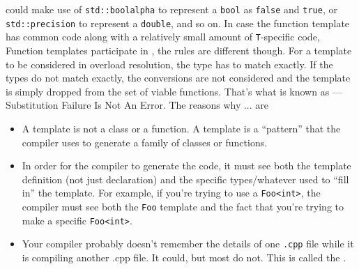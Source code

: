 could make use of \texttt{std::boolalpha} to represent a \texttt{bool} as 
\texttt{false} and \texttt{true}, or \texttt{std::precision} to represent a 
\texttt{double}, and so on.
\newline
In case the function template has common code along with a relatively 
small amount of \texttt{T}-specific code, 
\newline
Function templates participate in , 
the rules are different though. For a template to be considered in overload 
resolution, the type has to match exactly. If the types do not match exactly, 
the conversions are not considered and the template is simply dropped 
from the set of viable functions. That’s what is known as  — 
Substitution Failure Is Not An Error.
\newline
The reasons why ... are 
\begin{itemize}
    \item A template is not a class or a function. A template is a “pattern” 
          that the compiler uses to generate a family of classes or functions.
    \item In order for the compiler to generate the code, it must see both 
          the template definition (not just declaration) and the specific 
          types/whatever used to “fill in” the template. For example, 
          if you’re trying to use a \texttt{Foo<int>}, the compiler must 
          see both the \texttt{Foo} template and the fact that you’re 
          trying to make a specific \texttt{Foo<int>}.
    \item Your compiler probably doesn’t remember the details of one \texttt{.cpp} 
          file while it is compiling another .cpp file. It could, but most 
          do not.
          \newline
          This is called the .
\end{itemize}

